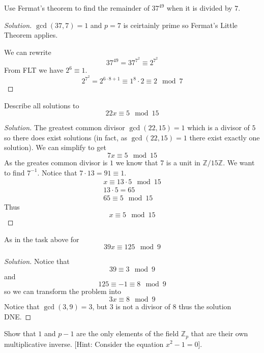 \begin{prob}
    Use Fermat's theorem to find the remainder of 
    $37^{49}$ when it is divided by $7$. 
\end{prob}
\begin{proof}[Solution]
    $\gcd(37,7) = 1$ and $p = 7$ is ceirtainly prime so 
    Fermat's Little Theorem applies. 

    We can rewrite 
    \[
        37^{49} = 37^{7^2} \equiv 2^{7^2}
    \]
    From FLT we have $2^{6} \equiv 1$. 
    \[
        2^{7^2} = 2^{6 \cdot 8 + 1} \equiv 1^8 \cdot 2 \equiv 2
        \mod 7
    \]
\end{proof}
\begin{prob}
    Describe all solutions to 
    \[
        22x \equiv 5 \mod 15
    \]
\end{prob}
\begin{proof}[Solution]
    The greatest common divisor $\gcd(22,15) = 1$ which is a 
    divisor of $5$ so there does exist solutions (in fact, as 
    $\gcd(22,15) = 1$ there exist exactly one solution). We can 
    simplify to get 
    \[
        7x \equiv 5 \mod 15
    \]
    As the greates common divisor is $1$ we know that $7$ is a 
    unit in $\mathbb Z/15\mathbb Z$. We want to find $7^{-1}$. 
    Notice that $7 \cdot 13 = 91 \equiv 1$. 
    \begin{align*}
        x \equiv 13 \cdot 5 \mod 15 \\ 
        13 \cdot 5 = 65 \\ 
        65 \equiv 5 \mod 15
    \end{align*}
    Thus 
    \[
        x \equiv 5 \mod 15
    \]
\end{proof}
\begin{prob}
    As in the task above for 
    \[
        39x \equiv 125 \mod 9
    \]
\end{prob}
\begin{proof}[Solution]
    Notice that 
    \[
        39 \equiv 3 \mod 9
    \]
    and 
    \[
        125 \equiv -1 \equiv 8 \mod 9
    \]
    so we can transform the problem into 
    \[
        3x \equiv 8 \mod 9
    \]
    Notice that $\gcd(3,9) = 3$, but $3$ is not a divisor of 
    $8$ thus the solution DNE. 
\end{proof}
\begin{prob}
    Show that $1$ and $p-1$ are the only elements of the 
    field $\mathbb Z_p$ that are their own multiplicative inverse. 
    [Hint: Consider the equation $x^2-1 = 0$].
\end{prob}
